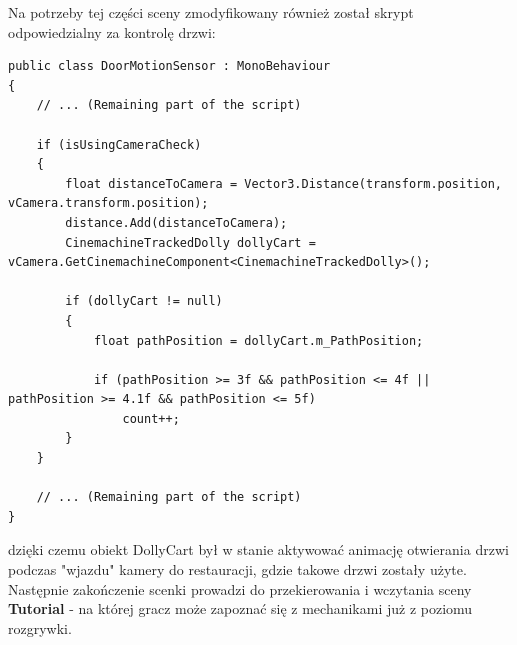 Na potrzeby tej części sceny zmodyfikowany również został skrypt odpowiedzialny za kontrolę drzwi:
\begin{codebox}
\begin{lstlisting}[language={[Sharp]C}, label={listing:DoorMotionSensor.cs}]
public class DoorMotionSensor : MonoBehaviour
{
    // ... (Remaining part of the script)
    
    if (isUsingCameraCheck)
    {
        float distanceToCamera = Vector3.Distance(transform.position, vCamera.transform.position);
        distance.Add(distanceToCamera);
        CinemachineTrackedDolly dollyCart = vCamera.GetCinemachineComponent<CinemachineTrackedDolly>();
        
        if (dollyCart != null)
        {
            float pathPosition = dollyCart.m_PathPosition;
            
            if (pathPosition >= 3f && pathPosition <= 4f || pathPosition >= 4.1f && pathPosition <= 5f)
                count++;
        }
    }
            
    // ... (Remaining part of the script)
}
\end{lstlisting}
\end{codebox}
dzięki czemu obiekt DollyCart był w stanie aktywować animację otwierania drzwi podczas "wjazdu" kamery do restauracji, gdzie takowe drzwi zostały użyte.
Następnie zakończenie scenki prowadzi do przekierowania i wczytania sceny \textbf{Tutorial} - na której gracz może zapoznać się z mechanikami już z poziomu rozgrywki.